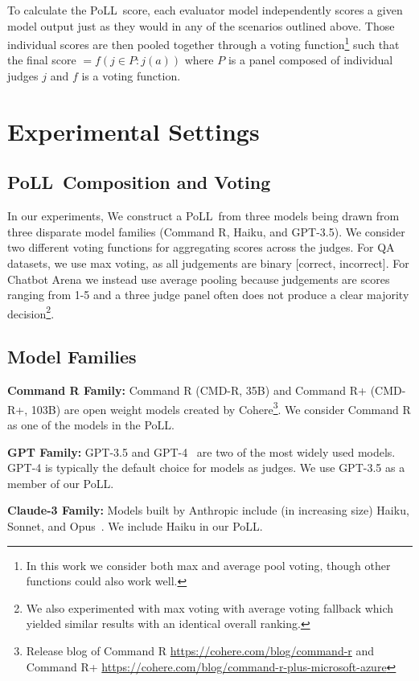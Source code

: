 \documentclass[11pt]{article}
\newcommand{\acronymnospace}{PoLL}
\newcommand{\acronym}{PoLL\ }
\begin{document}
To calculate the \acronym score, each evaluator model independently scores a given model output just as they would in any of the scenarios outlined above. Those individual scores are then pooled together through a voting function\footnote{In this work we consider both max and average pool voting, though other functions could also work well.} such that the final score  $= f(j \in P: j(a))$ where $P$ is a panel composed of individual judges $j$ and $f$ is a voting function. 

\section{Experimental Settings}

\subsection{\acronym Composition and Voting}
In our experiments, We construct a \acronym from three models being drawn from three disparate model families (Command 
R, Haiku, and GPT-3.5). We consider two different voting functions for aggregating scores across the judges. For QA datasets, we use max voting, as all judgements are binary [correct, incorrect]. For Chatbot Arena we instead use average pooling because judgements are scores ranging from 1-5 and a three judge panel often does not produce a clear majority decision\footnote{We also experimented with max voting with average voting fallback which yielded similar results with an identical overall ranking.}. 

\subsection{Model Families}
\noindent\textbf{Command R Family:}
Command R (CMD-R, 35B) and Command R+ (CMD-R+, 103B) are open weight models created by Cohere\footnote{Release blog of Command R \url{https://cohere.com/blog/command-r} and Command R+ \url{https://cohere.com/blog/command-r-plus-microsoft-azure}}.
We consider Command R as one of the models in the \acronymnospace.

\noindent\textbf{GPT Family:}
GPT-3.5 and GPT-4~\cite{openai2024gpt4} are two of the most widely used models. GPT-4 is typically the default choice for models as judges. We use GPT-3.5 as a member of our \acronymnospace.

\noindent\textbf{Claude-3 Family:}
Models built by Anthropic include (in increasing size) Haiku, Sonnet, and Opus~\cite{anthropic2024sonnet}. We include Haiku in our \acronymnospace. 
\end{document}

